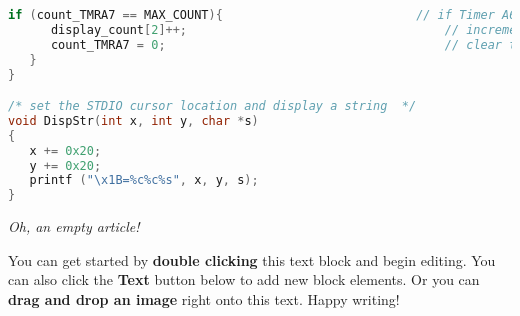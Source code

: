 \begin{lstlisting}[language=C]
   if (count_TMRA7 == MAX_COUNT){                           // if Timer A6 has interrupted the CPU 100 times
      display_count[2]++;                                    // increment the display counter
      count_TMRA7 = 0;                                       // clear the Timer A6 counter
   }
}

/* set the STDIO cursor location and display a string  */
void DispStr(int x, int y, char *s)
{
   x += 0x20;
   y += 0x20;
   printf ("\x1B=%c%c%s", x, y, s);
}
\end{lstlisting}

\textit{Oh, an empty article!} 

You can get started by \textbf{double clicking} this text block and begin editing. You can also click the \textbf{Text} button below to add new block elements. Or you can \textbf{drag and drop an image} right onto this text. Happy writing!